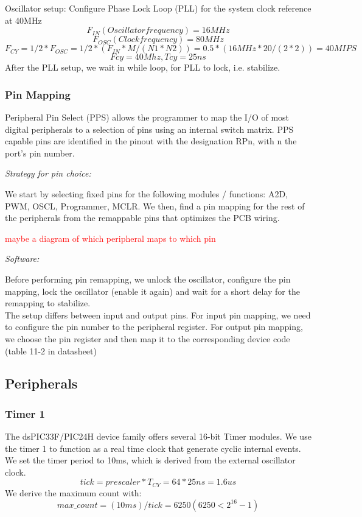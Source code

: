 Oscillator setup:
Configure Phase Lock Loop (PLL) for the system clock reference at 40MHz 
	$$F_{IN} (Oscillator frequency) = 16MHz  $$  
    $$F_{OSC} (Clock frequency) =  80MHz$$
 	$$F_{CY} = 1/2 * F_{OSC} = 1/2 * (F_{IN}*M/(N1*N2)) = 0.5 * (16MHz*20/(2*2)) = 40 MIPS$$
$$Fcy=40Mhz, Tcy=25ns$$
After the PLL setup, we wait in while loop, for PLL to lock, i.e. stabilize. 

\subsubsection*{Pin Mapping}

Peripheral Pin Select (PPS) allows the programmer to map the I/O of most digital peripherals to a selection of pins using an internal switch matrix.
PPS capable pins are identified in the pinout with the designation RPn, with n the port’s pin number. 

\textit{Strategy for pin choice:}

We start by selecting fixed pins for the following modules / functions: A2D, PWM, OSCL, Programmer, MCLR. We then, find a pin mapping for the rest of the peripherals from the remappable pins that optimizes the PCB wiring.

\textcolor{red}{
maybe a diagram of which peripheral maps to which pin
}

\textit{Software:}

Before performing pin remapping, we unlock the oscillator, configure the pin mapping, lock the oscillator (enable it again) and wait for a short delay for the remapping to stabilize.\\
The setup differs between input and output pins. For input pin mapping, we need to configure the pin number to the peripheral register. For output pin mapping, we choose the pin register and then map it to the corresponding device code (table 11-2 in datasheet)

\subsection{Peripherals}
\subsubsection*{Timer 1}
The dsPIC33F/PIC24H device family offers several 16-bit Timer modules. We use the timer 1 to function as a real time clock that generate cyclic internal events.\\
We set the timer period to 10ms, which is derived from the external oscillator clock.
$$tick=prescaler*T_{CY}= 64*25ns= 1.6us $$ 
We derive the maximum count with:
$$max\_count=(10 ms)/tick=6250 (6250<2^{16}-1)$$

